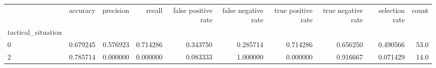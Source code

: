 \begin{tabular}{lrrrrrrrrr}
\toprule
{} &  accuracy &  precision &    recall &  false positive rate &  false negative rate &  true positive rate &  true negative rate &  selection rate &  count \\
tactical\_situation &           &            &           &                      &                      &                     &                     &                 &        \\
\midrule
0                  &  0.679245 &   0.576923 &  0.714286 &             0.343750 &             0.285714 &            0.714286 &            0.656250 &        0.490566 &   53.0 \\
2                  &  0.785714 &   0.000000 &  0.000000 &             0.083333 &             1.000000 &            0.000000 &            0.916667 &        0.071429 &   14.0 \\
\bottomrule
\end{tabular}
